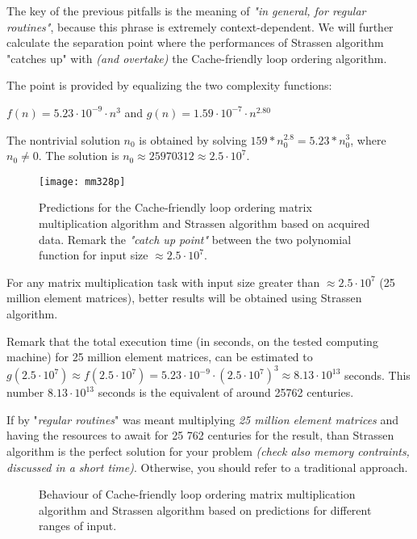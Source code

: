 The key of the previous pitfalls is the meaning of \textit{"in general, for regular routines"}, because this phrase is extremely context-dependent. We will further calculate the separation point where the performances of Strassen algorithm "catches up" with \textit{(and overtake)} the Cache-friendly loop ordering algorithm.

The point is provided by equalizing the two complexity functions:

$f(n) = 5.23 \cdot 10^{-9} \cdot n^{3} $ and $g(n) = 1.59 \cdot 10^{-7} \cdot n^{2.80} $

The nontrivial solution $n_{0}$ is obtained by solving $ 159 * n_{0}^{2.8} = 5.23* n_{0}^3 $, where $n_{0} \neq 0$. The solution is $n_{0} \approx 25970312 \approx 2.5 \cdot 10^7$.

\begin{figure}[H]
\centering
\texttt{[image: mm328p]}
\caption{Predictions for the Cache-friendly loop ordering matrix multiplication algorithm and Strassen algorithm based on acquired data. Remark the \textit{"catch up point"} between the two polynomial function for input size $\approx 2.5 \cdot 10^7$. }
\end{figure}

For any matrix multiplication task with input size greater than $\approx 2.5 \cdot 10^7$ (25 million element matrices), better results will be obtained using Strassen algorithm.

Remark that the total execution time (in seconds, on the tested computing machine) for 25 million element matrices, can be estimated to $g(2.5 \cdot 10^7) \approx f(2.5 \cdot 10^7) = 5.23 \cdot 10^{-9} \cdot (2.5 \cdot 10^7)^{3} \approx 8.13 \cdot 10^{13}$ seconds. This number $8.13 \cdot 10^{13} $ seconds is the equivalent of around 25762 centuries.

If by "\textit{regular routines}" was meant multiplying \textit{25 million element matrices} and having the resources to await for 25 762 centuries for the result, than Strassen algorithm is the perfect solution for your problem \textit{(check also memory contraints, discussed in a short time)}. Otherwise, you should refer to a traditional approach.

\begin{figure}[H]
\caption{Behaviour of Cache-friendly loop ordering matrix multiplication algorithm and Strassen algorithm based on predictions for different ranges of input.}
\end{figure}


